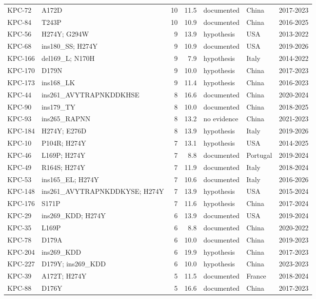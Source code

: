 \begin{longtable}{@{}l p{4.6cm} r r l l l@{}}
KPC-72 & A172D & 10 & 11.5 & documented & China & 2017-2023 \\
KPC-84 & T243P & 10 & 10.9 & documented & China & 2016-2025 \\
KPC-56 & H274Y; G294W & 9 & 13.9 & hypothesis & USA & 2013-2022 \\
KPC-68 & ins180\_SS; H274Y & 9 & 10.9 & documented & USA & 2019-2026 \\
KPC-166 & del169\_L; N170H & 9 & 7.9 & hypothesis & Italy & 2014-2022 \\
KPC-170 & D179N & 9 & 10.0 & hypothesis & China & 2017-2023 \\
KPC-173 & ins168\_LK & 9 & 11.4 & hypothesis & China & 2016-2023 \\
KPC-44 & ins261\_AVYTRAPNKDDKHSE & 8 & 16.6 & documented & China & 2020-2024 \\
KPC-90 & ins179\_TY & 8 & 10.0 & documented & China & 2018-2025 \\
KPC-93 & ins265\_RAPNN & 8 & 13.2 & no evidence & China & 2021-2023 \\
KPC-184 & H274Y; E276D & 8 & 13.9 & hypothesis & Italy & 2019-2026 \\
KPC-10 & P104R; H274Y & 7 & 13.1 & hypothesis & USA & 2014-2025 \\
KPC-46 & L169P; H274Y & 7 & 8.8 & documented & Portugal & 2019-2024 \\
KPC-49 & R164S; H274Y & 7 & 11.9 & documented & Italy & 2018-2024 \\
KPC-53 & ins165\_EL; H274Y & 7 & 10.6 & documented & Italy & 2016-2026 \\
KPC-148 & ins261\_AVYTRAPNKDDKYSE; H274Y & 7 & 13.9 & hypothesis & USA & 2015-2024 \\
KPC-176 & S171P & 7 & 11.6 & hypothesis & China & 2017-2024 \\
KPC-29 & ins269\_KDD; H274Y & 6 & 13.9 & documented & USA & 2019-2024 \\
KPC-35 & L169P & 6 & 8.8 & documented & China & 2020-2022 \\
KPC-78 & D179A & 6 & 10.0 & documented & China & 2019-2023 \\
KPC-204 & ins269\_KDD & 6 & 19.9 & hypothesis & China & 2017-2023 \\
KPC-227 & D179Y; ins269\_KDD & 6 & 10.0 & hypothesis & China & 2023-2023 \\
KPC-39 & A172T; H274Y & 5 & 11.5 & documented & France & 2018-2024 \\
KPC-88 & D176Y & 5 & 16.6 & documented & China & 2017-2023 \\

\end{longtable}
